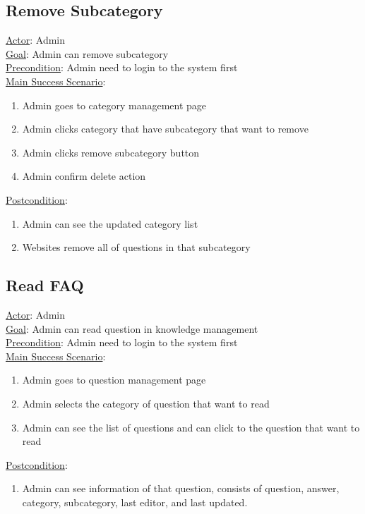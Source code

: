 \documentclass[12pt,oneside,openright,a4paper]{cpe-english-project}
\begin{document}
\subsection{Remove Subcategory}
\underline{Actor}: Admin\\
\underline{Goal}: Admin can remove subcategory\\
\underline{Precondition}: Admin need to login to the system first\\
\underline{Main Success Scenario}:
\begin{enumerate}[label={\arabic*.}]
	\item Admin goes to category management page
	\item Admin clicks category that have subcategory that want to remove
	\item Admin clicks remove subcategory button
	\item Admin confirm delete action
\end{enumerate}
\underline{Postcondition}: 
\begin{enumerate}[label={\arabic*.}]
	\item Admin can see the updated category list
	\item Websites remove all of questions in that subcategory
\end{enumerate}

\subsection{Read FAQ}
\underline{Actor}: Admin\\
\underline{Goal}: Admin can read question in knowledge management\\
\underline{Precondition}: Admin need to login to the system first\\
\underline{Main Success Scenario}:
\begin{enumerate}[label={\arabic*.}]
	\item Admin goes to question management page
	\item Admin selects the category of question that want to read
	\item Admin can see the list of questions and can click to the question that want to read
\end{enumerate}
\underline{Postcondition}: 
\begin{enumerate}[label={\arabic*.}]
	\item Admin can see information of that question, consists of question, answer, category, subcategory, last editor, and last updated.
\end{enumerate}
\end{document}
